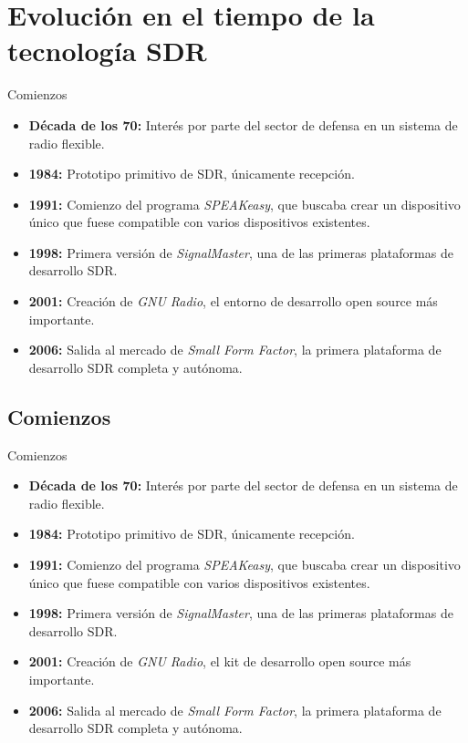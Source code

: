 \documentclass{beamer}
\begin{document}
\section{Evolución en el tiempo de la tecnología SDR}

\begin{frame}{Comienzos}

\begin{itemize}
	\item \textbf{Década de los 70:} Interés por parte del sector de defensa en un sistema de radio flexible.
	\item \textbf{1984:} Prototipo primitivo de SDR, únicamente recepción.
	\item \textbf{1991:} Comienzo del programa \emph{SPEAKeasy}, que buscaba crear un dispositivo único que fuese compatible con varios dispositivos existentes.
	\item \textbf{1998:} Primera versión de \emph{SignalMaster}, una de las primeras plataformas de desarrollo SDR.
	\item \textbf{2001:} Creación de \emph{GNU Radio}, el entorno de desarrollo open source más importante.
	\item \textbf{2006:} Salida al mercado de \emph{Small Form Factor}, la primera plataforma de desarrollo SDR completa y autónoma.
\end{itemize}

\end{frame}

\subsection{Comienzos}

\begin{frame}{Comienzos}

\begin{itemize}
	\item \textbf{Década de los 70:} Interés por parte del sector de defensa en un sistema de radio flexible.
	\item \textbf{1984:} Prototipo primitivo de SDR, únicamente recepción.
	\item \textbf{1991:} Comienzo del programa \emph{SPEAKeasy}, que buscaba crear un dispositivo único que fuese compatible con varios dispositivos existentes.
	\item \textbf{1998:} Primera versión de \emph{SignalMaster}, una de las primeras plataformas de desarrollo SDR.
	\item \textbf{2001:} Creación de \emph{GNU Radio}, el kit de desarrollo open source más importante.
	\item \textbf{2006:} Salida al mercado de \emph{Small Form Factor}, la primera plataforma de desarrollo SDR completa y autónoma.
\end{itemize}

\end{frame}
\end{document}
